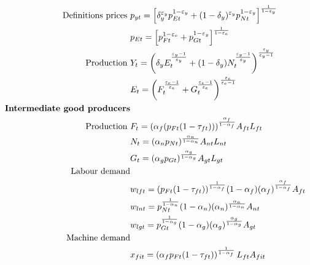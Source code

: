 \begin{align}
\text{Definitions prices}\ \vspace{4mm}&
p_{yt}= \left[\delta_y^{\varepsilon_y}p_{Et}^{1-\varepsilon_y}+(1-\delta_y)^{\varepsilon_y}p_{Nt}^{1-\varepsilon_y}\right]^\frac{1}{1-\varepsilon_y}\\
& p_{Et}= \left[p_{{F}t}^{1-\varepsilon_e}+p_{Gt}^{1-\varepsilon_y}\right]^\frac{1}{1-\varepsilon_e}\\
\text{Production}\ \vspace{4mm}& 
Y_t=\left(\delta_yE_t^\frac{\varepsilon_y-1}{\varepsilon_y}+(1-\delta_y)N_t^\frac{\varepsilon_y-1}{\varepsilon_y}\right)^\frac{\varepsilon_y}{\varepsilon_y-1}\\
&E_t=\left({F}_t^\frac{\varepsilon_e-1}{\varepsilon_e}+G_t^\frac{\varepsilon_e-1}{\varepsilon_e}\right)^\frac{\varepsilon_e}{\varepsilon_e-1}\\
\text{\textbf{Intermediate good producers}}&\\
\text{Production}\ \vspace{4mm}& F_t= (\alpha_f(p_{Ft}(1-\tau_{ft})))^\frac{ \alpha_f}{1-\alpha_f}A_{ft}L_{ft}\\
&N_t= (\alpha_np_{Nt})^\frac{ \alpha_n}{1-\alpha_n}A_{nt}L_{nt}\\
&G_t= (\alpha_gp_{Gt})^\frac{ \alpha_g}{1-\alpha_g}A_{gt}L_{gt}\\
%
\text{Labour demand}\label{eq:lab_demand}\\
& w_{lft}=(p_{Ft}(1-\tau_{ft}))^\frac{1}{1-\alpha_f}(1-\alpha_f)(\alpha_f)^\frac{\alpha_f}{1-\alpha_f}A_{ft}\\
& w_{lnt}=p_{Nt}^\frac{1}{1-\alpha_n}(1-\alpha_n)(\alpha_n)^\frac{\alpha_n}{1-\alpha_n}A_{nt}\\
& w_{lgt}=p_{Gt}^\frac{1}{1-\alpha_g}(1-\alpha_g)(\alpha_g)^\frac{\alpha_g}{1-\alpha_g}A_{gt}
\\
\text{Machine demand}&
\\
&x_{fit}= \left(\alpha_f p_{Ft}(1-\tau_{ft})\right)^\frac{1}{1-\alpha_f}L_{ft}A_{fit}\\

\end{align}

